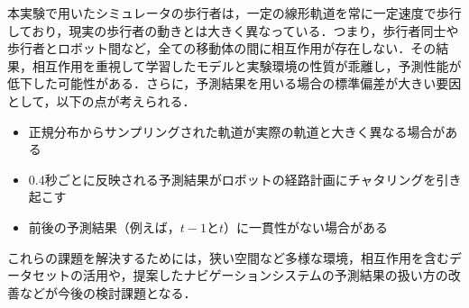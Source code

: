 本実験で用いたシミュレータの歩行者は，一定の線形軌道を常に一定速度で歩行しており，現実の歩行者の動きとは大きく異なっている．つまり，歩行者同士や歩行者とロボット間など，全ての移動体の間に相互作用が存在しない．その結果，相互作用を重視して学習したモデルと実験環境の性質が乖離し，予測性能が低下した可能性がある．さらに，予測結果を用いる場合の標準偏差が大きい要因として，以下の点が考えられる．
\begin{itemize}
  \item 正規分布からサンプリングされた軌道が実際の軌道と大きく異なる場合がある
  \item 0.4秒ごとに反映される予測結果がロボットの経路計画にチャタリングを引き起こす
  \item 前後の予測結果（例えば，$t-1\text{と}t$）に一貫性がない場合がある
\end{itemize}
これらの課題を解決するためには，狭い空間など多様な環境，相互作用を含むデータセットの活用や，提案したナビゲーションシステムの予測結果の扱い方の改善などが今後の検討課題となる．

\newpage

